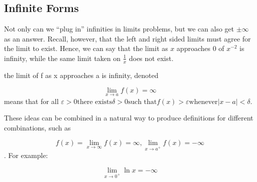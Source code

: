 \subsection{Infinite Forms}
Not only can we ``plug in'' infinities in limits problems, but we can also get
$\pm\infty$ as an answer.  Recall, however, that the left and right sided limits
must agree for the limit to exist.  Hence, we can say that the limit as $x$ 
approaches 0 of $x^{-2}$ is infinity, while the same limit taken on $\frac{1}{x}$
does not exist.


the limit of f as x approaches a is infinity, denoted

$$\lim_{x \to a} f(x) = \infty$$
means that for all $\varepsilon >0 \text{there exists}  \delta >0 \text{such that}  f(x) > \varepsilon \text{whenever}  |x - a| < \delta$.

These ideas can be combined in a natural way to produce definitions for different combinations, such as

$$f(x)=  \lim_{x \to \infty} f(x) = \infty, \lim_{x \to a^+}f(x) = -\infty$$.
For example:

$$ \lim_{x \to 0^+} \ln x = -\infty$$
